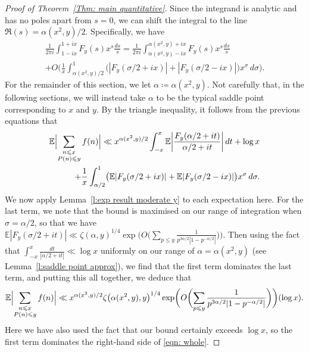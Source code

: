 \documentclass[12pt,a4paper,reqno]{amsart}
\numberwithin{equation}{section}
\def\E{\mathbb E}
\def\leq {\leqslant}
\theoremstyle{remark}
\theoremstyle{definition}
\numberwithin{equation}{section}
\theoremstyle{remark}
\def\E{\mathbb E}
\begin{document}
\begin{proof}[Proof of Theorem~\ref{Thm: main quantitative}]
Since the integrand is analytic and has no poles apart from $s=0$, we can shift the integral to the line $\Re(s) = \alpha(x^2, y)/2$. Specifically, we have
\begin{multline*}
\frac{1}{2 \pi i} \int_{1 - i x}^{1 + ix} F_y (s) x^s \frac{ds}{s} = \frac{1}{2 \pi i} \int_{\alpha (x^2, y) - ix}^{\alpha (x^2, y) + ix} F_y (s) x^s \frac{ds}{s} \\  
+ O \biggl( \frac{1}{x} \int_{\alpha (x^2, y)/2}^1 \bigl( |F_y (\sigma / 2 + ix)| + |F_y (\sigma / 2 - ix)| \bigr) x^{\sigma} \, d \sigma \biggr) .
\end{multline*}
For the remainder of this section, we let $\alpha \coloneqq \alpha (x^2, y)$. Not carefully that, in the following sections, we will instead take $\alpha$ to be the typical saddle point corresponding to $x$ and $y$. By the triangle inequality, it follows from the previous equations that 
\begin{equation}\label{eqn: whole}
   \begin{split}
       \E \Bigl| \sum_{\substack{n \leq x \\ P(n) \leq y}} f(n) \Bigr| \ll  x^{\alpha(x^2, y)/2} \int_{-x}^{x} \E \biggl| \frac{F_y (\alpha / 2 + it)}{\alpha / 2 + it} \biggr| \, dt + \log x \\ 
+ \frac{1}{x} \int_{\alpha/2}^1 \bigl( \E |F_y (\sigma / 2 + ix)| + \E |F_y (\sigma / 2 - ix)| \bigr) x^{\sigma} \, d \sigma. 
   \end{split} 
\end{equation}
We now apply Lemma~\ref{l:exp result moderate y} to each expectation here. For the last term, we note that the bound is maximised on our range of integration when $\sigma = \alpha/2$, so that we have $\E |F_y (\sigma / 2 + it)| \ll \zeta(\alpha, y)^{1/4} \exp \bigl( O \bigl( \sum_{p \leq y} \frac{1}{p^{3 \alpha / 2} | 1 - p^{-\alpha /2}|} \bigr) \bigr)$. Then using the fact that $\int_{-x}^{x} \frac{dt}{|\alpha/2 + it|} \ll \log x$ uniformly on our range of $\alpha = \alpha (x^2, y)$ (see Lemma~\ref{l:saddle point approx}), we find that the first term dominates the last term, and putting this all together, we deduce that
\begin{equation}\label{equ: moderate y before triangle}
\E \Bigl| \sum_{\substack{n \leq x \\ P(n) \leq y}} f(n) \Bigr| \ll x^{\alpha (x^2, y)/2} \zeta \bigl( \alpha (x^2, y), y \bigr)^{1/4} \exp \biggl( O \biggl( \sum_{p \leq y} \frac{1}{p^{3 \alpha / 2} |1 - p^{-\alpha / 2}|} \biggr) \biggr) (\log x).
\end{equation}
Here we have also used the fact that our bound certainly exceeds $\log x$, so the first term dominates the right-hand side of \eqref{eqn: whole}.


\end{proof}
\end{document}
